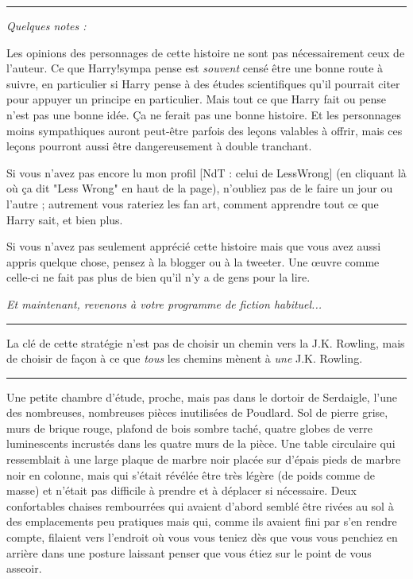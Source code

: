 \par\noindent\rule{\textwidth}{0.4pt}

\begin{center}\emph{Quelques notes :} \end{center}


Les opinions des personnages de cette histoire ne sont pas nécessairement ceux de l'auteur. Ce que Harry!sympa pense est \emph{souvent}  censé être une bonne route à suivre, en particulier si Harry pense à des études scientifiques qu'il pourrait citer pour appuyer un principe en particulier. Mais tout ce que Harry fait ou pense n'est pas une bonne idée. Ça ne ferait pas une bonne histoire. Et les personnages moins sympathiques auront peut-être parfois des leçons valables à offrir, mais ces leçons pourront aussi être dangereusement à double tranchant.

Si vous n'avez pas encore lu mon profil [NdT : celui de LessWrong] (en cliquant là où ça dit "Less Wrong" en haut de la page), n'oubliez pas de le faire un jour ou l'autre ; autrement vous rateriez les fan art, comment apprendre tout ce que Harry sait, et bien plus.

Si vous n'avez pas seulement apprécié cette histoire mais que vous avez aussi appris quelque chose, pensez à la blogger ou à la tweeter. Une œuvre comme celle-ci ne fait pas plus de bien qu'il n'y a de gens pour la lire.


\begin{center}\emph{Et maintenant, revenons à votre programme de fiction habituel...} \end{center}

\par\noindent\rule{\textwidth}{0.4pt}
La clé de cette stratégie n'est pas de choisir un chemin vers la J.K. Rowling, mais de choisir de façon à ce que \emph{tous}  les chemins mènent à \emph{une}  J.K. Rowling.
\par\noindent\rule{\textwidth}{0.4pt}
Une petite chambre d'étude, proche, mais pas dans le dortoir de Serdaigle, l'une des nombreuses, nombreuses pièces inutilisées de Poudlard. Sol de pierre grise, murs de brique rouge, plafond de bois sombre taché, quatre globes de verre luminescents incrustés dans les quatre murs de la pièce. Une table circulaire qui ressemblait à une large plaque de marbre noir placée sur d'épais pieds de marbre noir en colonne, mais qui s'était révélée être très légère (de poids comme de masse) et n'était pas difficile à prendre et à déplacer si nécessaire. Deux confortables chaises rembourrées qui avaient d'abord semblé être rivées au sol à des emplacements peu pratiques mais qui, comme ils avaient fini par s'en rendre compte, filaient vers l'endroit où vous vous teniez dès que vous vous penchiez en arrière dans une posture laissant penser que vous étiez sur le point de vous asseoir.

